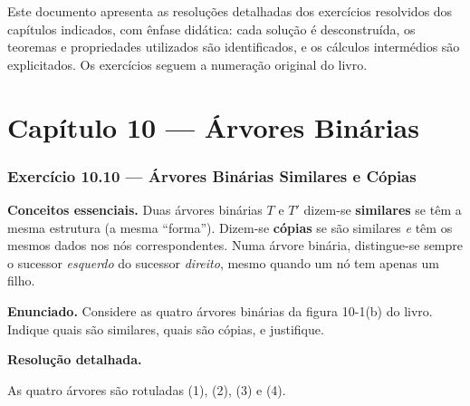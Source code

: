 \documentclass[12pt,a4paper]{article}
\newcommand{\keyword}[1]{\textbf{\textcolor{azul}{#1}}}
\begin{document}
Este documento apresenta as resoluções detalhadas dos exercícios resolvidos dos capítulos
indicados, com ênfase didática: cada solução é desconstruída, os teoremas e propriedades
utilizados são identificados, e os cálculos intermédios são explicitados.
Os exercícios seguem a numeração original do livro.

\newpage
\part*{Capítulo 10 — Árvores Binárias}

\section*{Exercício 10.10 — Árvores Binárias Similares e Cópias}

\begin{teoriacaixa}
\textbf{Conceitos essenciais.}
Duas árvores binárias $T$ e $T'$ dizem-se \keyword{similares} se têm a mesma estrutura
(a mesma ``forma''). Dizem-se \keyword{cópias} se são similares \emph{e} têm os mesmos
dados nos nós correspondentes. Numa árvore binária, distingue-se sempre o sucessor
\emph{esquerdo} do sucessor \emph{direito}, mesmo quando um nó tem apenas um filho.
\end{teoriacaixa}

\medskip
\textbf{Enunciado.} Considere as quatro árvores binárias da figura 10-1(b) do livro.
Indique quais são similares, quais são cópias, e justifique.

\medskip
\textbf{Resolução detalhada.}

As quatro árvores são rotuladas (1), (2), (3) e (4).
\end{document}
